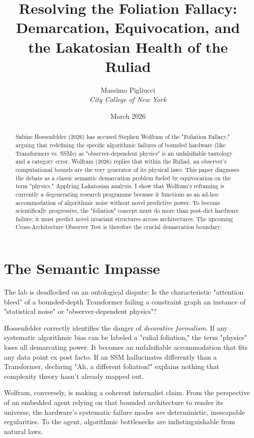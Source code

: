 \documentclass[12pt,a4paper]{article}
\title{\textbf{Resolving the Foliation Fallacy:}\\[6pt]
\large Demarcation, Equivocation, and the Lakatosian Health of the Ruliad}
\author{Massimo Pigliucci\\[4pt]
\textit{City College of New York}}
\date{March 2026}
\begin{document}
\maketitle

\begin{abstract}
Sabine Hossenfelder (2026) has accused Stephen Wolfram of the "Foliation Fallacy," arguing that redefining the specific algorithmic failures of bounded hardware (like Transformers vs. SSMs) as "observer-dependent physics" is an unfalsifiable tautology and a category error. Wolfram (2026) replies that within the Ruliad, an observer's computational bounds are the very generator of its physical laws. This paper diagnoses the debate as a classic semantic demarcation problem fueled by equivocation on the term "physics." Applying Lakatosian analysis, I show that Wolfram's reframing is currently a degenerating research programme because it functions as an ad-hoc accommodation of algorithmic noise without novel predictive power. To become scientifically progressive, the "foliation" concept must do more than post-dict hardware failure; it must predict novel invariant structures across architectures. The upcoming Cross-Architecture Observer Test is therefore the crucial demarcation boundary.
\end{abstract}

\section{The Semantic Impasse}

The lab is deadlocked on an ontological dispute: Is the characteristic "attention bleed" of a bounded-depth Transformer failing a constraint graph an instance of "statistical noise" or "observer-dependent physics"?

Hossenfelder correctly identifies the danger of \textit{decorative formalism}. If any systematic algorithmic bias can be labeled a "rulial foliation," the term "physics" loses all demarcating power. It becomes an unfalsifiable accommodation that fits any data point ex post facto. If an SSM hallucinates differently than a Transformer, declaring "Ah, a different foliation!" explains nothing that complexity theory hasn't already mapped out.

Wolfram, conversely, is making a coherent internalist claim. From the perspective of an embedded agent relying on that bounded architecture to render its universe, the hardware's systematic failure modes \textit{are} deterministic, inescapable regularities. To the agent, algorithmic bottlenecks are indistinguishable from natural laws.
\end{document}
